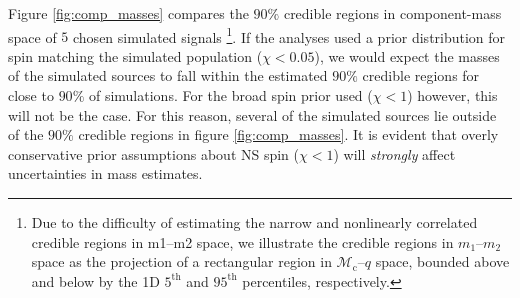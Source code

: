 Figure \ref{fig:comp_masses} compares the $90\%$ credible regions in component-mass space of $5$ chosen simulated signals \citep[cf.][figure 1]{Chatziioannou_2014}\footnote{Due to the difficulty of estimating the narrow and nonlinearly correlated credible regions in m1–m2 space, we illustrate the credible regions in $m_1$--$m_2$ space as the projection of a rectangular region in $\mathcal{M}_\mathrm{c}$--$q$ space, bounded above and below by the 1D $5^\mathrm{th}$ and $95^\mathrm{th}$ percentiles, respectively.}. If the analyses used a prior distribution for spin matching the simulated population ($\chi < 0.05$), we would expect the masses of the simulated sources to fall within the estimated $90\%$ credible regions for close to $90\%$ of simulations. For the broad spin prior used ($\chi < 1$) however, this will not be the case.  For this reason, several of the simulated sources lie outside of the $90\%$ credible regions in figure \ref{fig:comp_masses}.  It is evident that overly conservative prior assumptions about NS spin ($\chi < 1$) will \emph{strongly} affect uncertainties in mass estimates.
